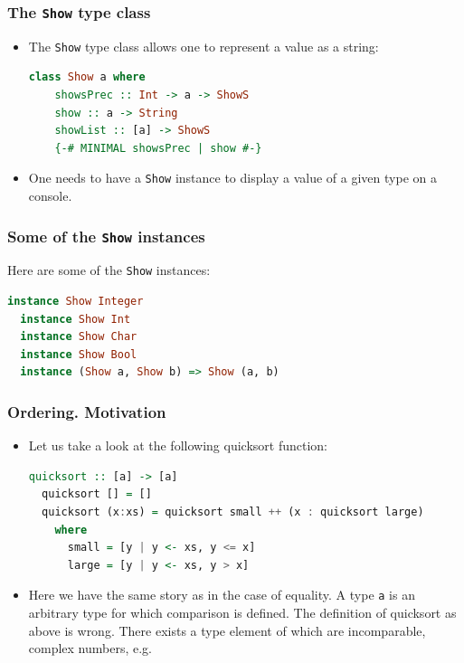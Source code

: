\documentclass[10pt,pdf,utf8,russian,aspectratio=169]{beamer}
\begin{document}
\begin{frame}[fragile]
  \frametitle{The \verb"Show" type class}

\begin{itemize}
  \item The \verb"Show" type class allows one to represent a value as a string:
  \begin{lstlisting}[language=Haskell]
  class Show a where
    showsPrec :: Int -> a -> ShowS
    show :: a -> String
    showList :: [a] -> ShowS
    {-# MINIMAL showsPrec | show #-}
  \end{lstlisting}
  \item One needs to have a \verb"Show" instance to display a value of a given type on a console.
\end{itemize}
\end{frame}

\begin{frame}[fragile]
  \frametitle{Some of the \verb"Show" instances}

Here are some of the \verb"Show" instances:
\begin{lstlisting}[language=Haskell]
  instance Show Integer
  instance Show Int
  instance Show Char
  instance Show Bool
  instance (Show a, Show b) => Show (a, b)
\end{lstlisting}
\end{frame}

\begin{frame}[fragile]
  \frametitle{Ordering. Motivation}
  \begin{itemize}
  \item Let us take a look at the following quicksort function:

  \begin{lstlisting}[language=Haskell]
  quicksort :: [a] -> [a]
  quicksort [] = []
  quicksort (x:xs) = quicksort small ++ (x : quicksort large)
    where
      small = [y | y <- xs, y <= x]
      large = [y | y <- xs, y > x]
  \end{lstlisting}
  \item Here we have the same story as in the case of equality. A type \verb"a" is an arbitrary type for which comparison is defined. The definition of quicksort as above is wrong. There exists a type element of which are incomparable, complex numbers, e.g.
\end{itemize}
\end{frame}
\end{document}
